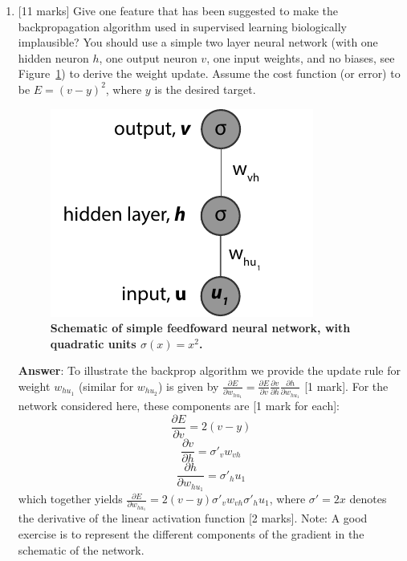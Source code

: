 \documentclass{article}
\newif\ifanswer
\begin{document}
\begin{enumerate}
\begin{enumerate}
  \ifanswer \textbf{Answer}: The classical example of supervised learning in the brain is in the cerebellum, where specific error signals appears to be computed [2.5 marks]. However, the cortex may also use some forms of supervised learning by relying on internally generated supervised signals, which may in turn use algorithms akin to the backpropagation algorithm to efficiently update synaptic weights [2.5 marks].\\
  \fi


\item{}[11 marks] Give one feature that has been suggested to make the backpropagation algorithm used in supervised learning biologically implausible? You should use a simple two layer neural network (with one hidden neuron $h$, one output neuron $v$, one input weights, and no biases, see Figure~\ref{fig:backprop_ff}) to derive the weight update. Assume the cost function (or error) to be $E = (v-y)^2$, where $y$ is the desired target.

\begin{figure}[htb!]
  \centering
  \includegraphics[width=0.4\linewidth]{backprop_ff}
  \caption{\textbf{Schematic of simple feedfoward neural network, with quadratic units $\sigma (x) = x^2$.}}
  \label{fig:backprop_ff}
\end{figure}

  \ifanswer \textbf{Answer}: To illustrate the backprop algorithm we provide the update rule for weight $w_{hu_1}$ (similar for $w_{hu_2}$) is given by $\frac{\partial E}{\partial w_{hu_1}} = \frac{\partial E}{\partial v}\frac{\partial v}{\partial h}\frac{\partial h}{\partial w_{hu_1}}$ [1 mark]. For the network considered here, these components are [1 mark for each]:
\begin{equation}
\frac{\partial E}{\partial v} = 2(v-y)
\label{eq:dEdv}
\end{equation}
\begin{equation}
\frac{\partial v}{\partial h} = \sigma'_v w_{vh}
\label{eq:dvdh}
\end{equation}
\begin{equation}
\frac{\partial h}{\partial w_{hu_1}} = \sigma'_h u_1
\label{eq:dhdw}
\end{equation}
which together yields $\frac{\partial E}{\partial w_{hu_1}} = 2(v-y) \sigma'_v w_{vh} \sigma'_h u_1$, where $\sigma'=2x$ denotes the derivative of the linear activation function [2 marks]. Note: A good exercise is to represent the different components of the gradient in the schematic of the network.\\



\end{enumerate}
\end{enumerate}
\end{document}
